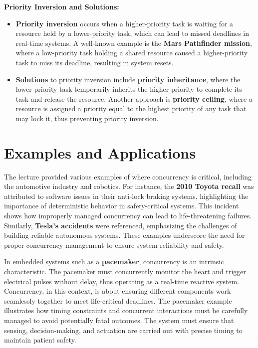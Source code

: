 \documentclass[
  14pt,
  a4paper,
  numbers=noendperiod,
  headinclude=true,
  footinclude=true,
  DIV=calc]{scrreprt}
\begin{document}
\textbf{Priority Inversion and Solutions:}

\begin{itemize}
\item
  \textbf{Priority inversion} occurs when a higher-priority task is
  waiting for a resource held by a lower-priority task, which can lead
  to missed deadlines in real-time systems. A well-known example is the
  \textbf{Mars Pathfinder mission}, where a low-priority task holding a
  shared resource caused a higher-priority task to miss its deadline,
  resulting in system resets.
\item
  \textbf{Solutions} to priority inversion include \textbf{priority
  inheritance}, where the lower-priority task temporarily inherits the
  higher priority to complete its task and release the resource. Another
  approach is \textbf{priority ceiling}, where a resource is assigned a
  priority equal to the highest priority of any task that may lock it,
  thus preventing priority inversion.
\end{itemize}

\section{Examples and Applications}\label{examples-and-applications}

The lecture provided various examples of where concurrency is critical,
including the automotive industry and robotics. For instance, the
\textbf{2010 Toyota recall} was attributed to software issues in their
anti-lock braking systems, highlighting the importance of deterministic
behavior in safety-critical systems. This incident shows how improperly
managed concurrency can lead to life-threatening failures. Similarly,
\textbf{Tesla's accidents} were referenced, emphasizing the challenges
of building reliable autonomous systems. These examples underscore the
need for proper concurrency management to ensure system reliability and
safety.

In embedded systems such as a \textbf{pacemaker}, concurrency is an
intrinsic characteristic. The pacemaker must concurrently monitor the
heart and trigger electrical pulses without delay, thus operating as a
real-time reactive system. Concurrency, in this context, is about
ensuring different components work seamlessly together to meet
life-critical deadlines. The pacemaker example illustrates how timing
constraints and concurrent interactions must be carefully managed to
avoid potentially fatal outcomes. The system must ensure that sensing,
decision-making, and actuation are carried out with precise timing to
maintain patient safety.
\end{document}
